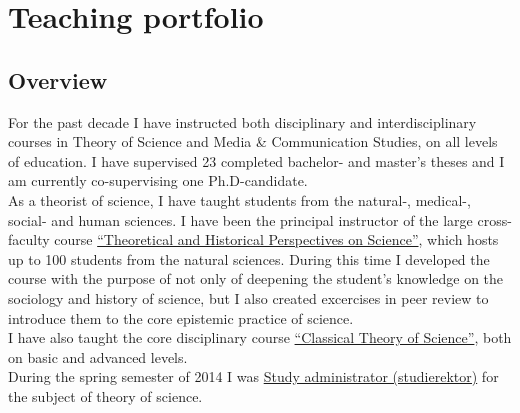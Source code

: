 \documentclass[a4paper,11pt,oneside]{article}
\begin{document}

\clearpage
\setlength\parindent{0cm}

\section{Teaching portfolio}

  \subsection{Overview}
  For the past decade I have instructed both disciplinary and interdisciplinary courses
  in Theory of Science and Media \& Communication Studies, on all levels of education.
  I have supervised 23 completed bachelor- and master's theses and I am currently
  co-supervising one Ph.D-candidate. \\

  As a theorist of science, I have taught students from the natural-,
  medical-, social- and human sciences. I have been the principal
  instructor of the large cross-faculty course  \href{http://files.christopherkullenberg.se/kursplaner/NTH001_Teoretiska_och_historiska_perspektiv_pa%cc%8a_naturvetenskap_10512.pdf}{``Theoretical and Historical Perspectives on Science''},
  which hosts up to 100 students from the natural sciences. During this time I
  developed the course with the purpose of not only of deepening the student's
  knowledge on the sociology and history of science, but I also created excercises
  in peer review to introduce them to the core epistemic practice of science.\\

  I have also taught the core disciplinary course \href{http://files.christopherkullenberg.se/kursplaner/VT2106_Klassisk_vetenskapsteori_13187.pdf}{``Classical Theory of Science''},
  both on basic and advanced levels. \\

  During the spring semester of 2014 I was \href{http://files.christopherkullenberg.se/studierektoronline.pdf}{Study administrator (studierektor)} for the subject of theory of science. \\
\end{document}
